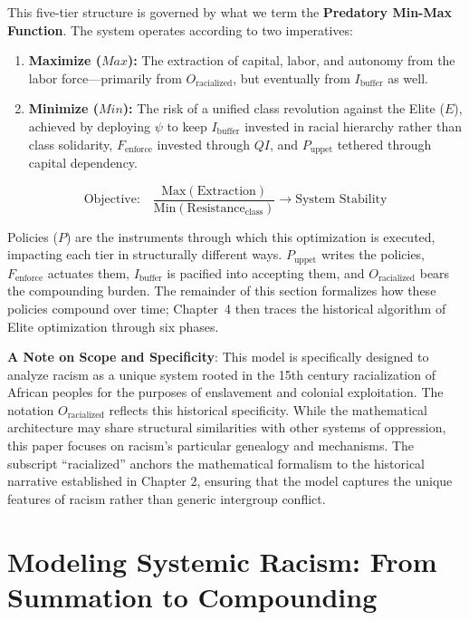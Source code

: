 \documentclass[12pt,openany]{book}
\begin{document}
This five-tier structure is governed by what we term the \textbf{Predatory Min-Max Function}. The system operates according to two imperatives:

\begin{enumerate}
    \item \textbf{Maximize ($Max$):} The extraction of capital, labor, and autonomy from the labor force---primarily from $O_{\text{racialized}}$, but eventually from $I_{\text{buffer}}$ as well.
    \item \textbf{Minimize ($Min$):} The risk of a unified class revolution against the Elite ($E$), achieved by deploying $\psi$ to keep $I_{\text{buffer}}$ invested in racial hierarchy rather than class solidarity, $F_{\text{enforce}}$ invested through $QI$, and $P_{\text{uppet}}$ tethered through capital dependency.
\end{enumerate}

\[
\text{Objective:} \quad \frac{\text{Max}(\text{Extraction})}{\text{Min}(\text{Resistance}_{\text{class}})} \rightarrow \text{System Stability}
\]

Policies ($P$) are the instruments through which this optimization is executed, impacting each tier in structurally different ways. $P_{\text{uppet}}$ writes the policies, $F_{\text{enforce}}$ actuates them, $I_{\text{buffer}}$ is pacified into accepting them, and $O_{\text{racialized}}$ bears the compounding burden. The remainder of this section formalizes how these policies compound over time; Chapter~4 then traces the historical algorithm of Elite optimization through six phases.

\textbf{A Note on Scope and Specificity}: This model is specifically designed to analyze racism as a unique system rooted in the 15th century racialization of African peoples for the purposes of enslavement and colonial exploitation. The notation $O_{\text{racialized}}$ reflects this historical specificity. While the mathematical architecture may share structural similarities with other systems of oppression, this paper focuses on racism's particular genealogy and mechanisms. The subscript ``racialized'' anchors the mathematical formalism to the historical narrative established in Chapter 2, ensuring that the model captures the unique features of racism rather than generic intergroup conflict.

\section{Modeling Systemic Racism: From Summation to Compounding}
\end{document}
